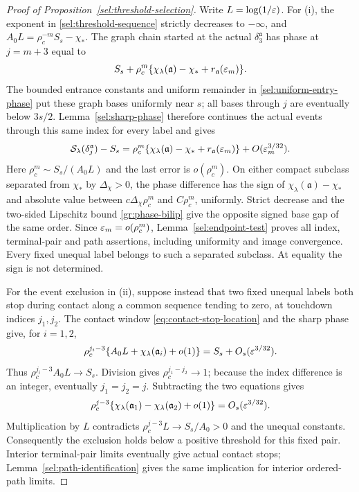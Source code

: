 \begin{proof}[Proof of Proposition~\ref{sel:threshold-selection}]
Write $L=\log(1/\varepsilon)$. For \textup{(i)}, the exponent in
\eqref{sel:threshold-sequence} strictly decreases to $-\infty$, and
$A_0L=\rho_c^{-m}S_s-\chi_*$. The graph chain started at the actual
$\delta_3^{\mathfrak a}$ has phase at $j=m+3$ equal to
\[
 S_s+\rho_c^m\{\chi_\lambda(\mathfrak a)-\chi_*
                         +r_{\mathfrak a}(\varepsilon_m)\}.
\]
The bounded entrance constants and uniform remainder in
\eqref{sel:uniform-entry-phase} put these graph bases uniformly
near $s$; all bases through $j$ are eventually below $3s/2$.
Lemma~\ref{sel:sharp-phase} therefore continues the actual events
through this same index for every label and gives
\begin{equation}
 \mathcal S_\lambda(\delta_j^{\mathfrak a})-S_s
 =\rho_c^m\{\chi_\lambda(\mathfrak a)-\chi_*
                        +r_{\mathfrak a}(\varepsilon_m)\}
                       +O(\varepsilon_m^{3/32}).
 \label{sel:threshold-phase}
\end{equation}
Here $\rho_c^m\sim S_s/(A_0L)$ and the last error is
$o(\rho_c^m)$. On either compact subclass separated from $\chi_*$
by $\Delta_\chi>0$, the phase difference has the sign of
$\chi_\lambda(\mathfrak a)-\chi_*$ and absolute value between
$c\Delta_\chi\rho_c^m$ and $C\rho_c^m$, uniformly.
Strict decrease and the two-sided Lipschitz bound
\eqref{gr:phase-bilip} give the opposite signed base gap of the
same order. Since $\varepsilon_m=o(\rho_c^m)$,
Lemma~\ref{sel:endpoint-test} proves all index, terminal-pair and
path assertions, including uniformity and image convergence.
Every fixed unequal label belongs to such a separated subclass.
At equality the sign is not determined.

For the event exclusion in \textup{(ii)}, suppose instead that
two fixed unequal labels both stop during contact along a common
sequence tending to zero, at touchdown indices $j_1,j_2$.
The contact window \eqref{eq:contact-stop-location} and the sharp phase
give, for $i=1,2$,
\[
 \rho_c^{j_i-3}
       \{A_0L+\chi_\lambda(\mathfrak a_i)+o(1)\}
                =S_s+O_s(\varepsilon^{3/32}).
\]
Thus $\rho_c^{j_i-3}A_0L\to S_s$. Division gives
$\rho_c^{j_1-j_2}\to1$; because the index difference is an integer,
eventually $j_1=j_2=j$. Subtracting the two equations gives
\[
 \rho_c^{j-3}
 \{\chi_\lambda(\mathfrak a_1)-\chi_\lambda(\mathfrak a_2)+o(1)\}
                   =O_s(\varepsilon^{3/32}).
\]
Multiplication by $L$ contradicts
$\rho_c^{j-3}L\to S_s/A_0>0$ and the unequal constants.
Consequently the exclusion holds below a positive threshold for
this fixed pair. Interior terminal-pair limits eventually give
actual contact stops; Lemma~\ref{sel:path-identification} gives
the same implication for interior ordered-path limits.


\end{proof}
